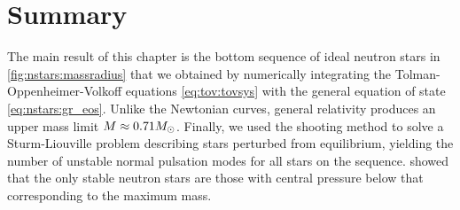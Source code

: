 \section{Summary}

The main result of this chapter is the bottom sequence of ideal neutron stars in \cref{fig:nstars:massradius} that we obtained by numerically integrating the Tolman-Oppenheimer-Volkoff equations \eqref{eq:tov:tovsys} with the general equation of state \eqref{eq:nstars:gr_eos}.
Unlike the Newtonian curves, general relativity produces an upper mass limit $M \approx 0.71 M_\odot$.
Finally, we used the shooting method to solve a Sturm-Liouville problem describing stars perturbed from equilibrium, yielding the number of unstable normal pulsation modes for all stars on the sequence.
 showed that the only stable neutron stars are those with central pressure below that corresponding to the maximum mass.

